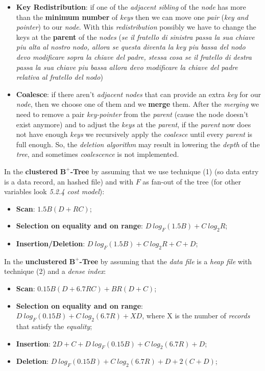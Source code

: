 \documentclass{article}
\begin{document}
\begin{itemize}
\begin{itemize}
\item \textbf{Key Redistribution}: if one of the \emph{adjacent sibling} of the \emph{node} has more than the \textbf{minimum number} of \emph{keys} then we can move one \emph{pair} (\emph{key and pointer}) to our \emph{node}. With this \emph{redistribution} possibly we have to change the keys at the \textbf{parent} of the \emph{nodes} (\emph{se il fratello di sinistra passa la sua chiave piu alta al nostro nodo, allora se questa diventa la key piu bassa del nodo devo modificare sopra la chiave del padre, stessa cosa se il fratello di destra passa la sua chiave piu bassa allora devo modificare la chiave del padre relativa al fratello del nodo})
\item \textbf{Coalesce}: if there aren't \emph{adjacent nodes} that can provide an extra \emph{key} for our \emph{node}, then we choose one of them and we \textbf{merge} them. After the \emph{merging} we need to remove a pair \emph{key-pointer} from the \emph{parent} (cause the node doesn't exist anymore) and to adjust the \emph{keys} at the \emph{parent}, if the \emph{parent} now does not have enough \emph{keys} we recursively apply the \emph{coalesce} until every \emph{parent} is full enough. So, the \emph{deletion algorithm} may result in lowering the \emph{depth} of the \emph{tree}, and sometimes \emph{coalescence} is not implemented. 
\end{itemize}
\end{itemize}
In the \textbf{clustered}  \textbf{$\mathbf{B^+}$-Tree} by assuming that we use technique (1) (so data entry is a data record, an hashed file) and with $F$ as fan-out of the tree (for other variables look\emph{ 5.2.4 cost model}):
\begin{itemize}
\item \textbf{Scan}: $1.5B(D+RC)$;
\item \textbf{Selection on equality and on range}: $D\ log_F(1.5B) + C\ log_2R$;
\item \textbf{Insertion/Deletion}: $D\ log_F(1.5B)+ C\ log_2R + C + D$;
\end{itemize}
In the \textbf{unclustered}  \textbf{$\mathbf{B^+}$-Tree} by assuming that the\emph{ data file} is a \emph{heap file} with technique (2) and a\emph{ dense index}:
\begin{itemize}
\item \textbf{Scan}: $0.15B(D+6.7RC) + BR(D+C)$;
\item \textbf{Selection on equality and on range}: $D\ log_F(0.15B) + C\ log_2(6.7R) + XD$, where X is the number of \emph{records} that satisfy the \emph{equality};
\item \textbf{Insertion}: $2D + C + D\ log_F(0.15B)+ C\ log_2(6.7R) + D$;
\item \textbf{Deletion}: $ D\ log_F(0.15B)+ C\ log_2(6.7R) + D + 2(C+D)$;
\end{itemize}
\end{document}
